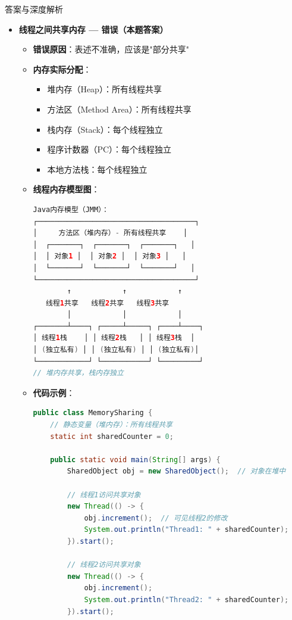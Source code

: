 \documentclass[12pt, a4paper]{ctexart}
\begin{document}
\begin{enumerate}[label=\textbf{\arabic*.}]
\begin{bluebox}{答案与深度解析}
\begin{itemize}[leftmargin=*, nosep, label={}]
			      \item[B] \textbf{线程之间共享内存 — 错误（本题答案）}
			            \begin{itemize}[label={}, leftmargin=*, nosep]
				            \item \textbf{错误原因}：表述不准确，应该是"部分共享"
				            \item \textbf{内存实际分配}：
				                  \begin{itemize}[label={}, nosep]
					                  \item 堆内存（Heap）：所有线程共享
					                  \item 方法区（Method Area）：所有线程共享
					                  \item 栈内存（Stack）：每个线程独立
					                  \item 程序计数器（PC）：每个线程独立
					                  \item 本地方法栈：每个线程独立
				                  \end{itemize}
				            \item \textbf{线程内存模型图}：
				                  \begin{lstlisting}[language=Java]
Java内存模型（JMM）：
┌─────────────────────────────────────┐
│     方法区（堆内存）- 所有线程共享    │
│  ┌───────┐  ┌───────┐  ┌───────┐   │
│  │ 对象1 │  │ 对象2 │  │ 对象3 │   │
│  └───────┘  └───────┘  └───────┘   │
└─────────────────────────────────────┘
        ↑            ↑            ↑
   线程1共享   线程2共享   线程3共享
        │            │            │
┌───────┴────┐ ┌─────┴─────┐ ┌────┴────┐
│ 线程1栈    │ │ 线程2栈   │ │ 线程3栈  │
│ (独立私有) │ │ (独立私有) │ │ (独立私有)│
└────────────┘ └───────────┘ └─────────┘
// 堆内存共享，栈内存独立
					      \end{lstlisting}
				            \item \textbf{代码示例}：
				                  \begin{lstlisting}[language=Java]
public class MemorySharing {
    // 静态变量（堆内存）：所有线程共享
    static int sharedCounter = 0;

    public static void main(String[] args) {
        SharedObject obj = new SharedObject();  // 对象在堆中

        // 线程1访问共享对象
        new Thread(() -> {
            obj.increment();  // 可见线程2的修改
            System.out.println("Thread1: " + sharedCounter);
        }).start();

        // 线程2访问共享对象
        new Thread(() -> {
            obj.increment();
            System.out.println("Thread2: " + sharedCounter);
        }).start();


\end{lstlisting}
\end{itemize}
\end{itemize}
\end{bluebox}
\end{enumerate}
\end{document}
